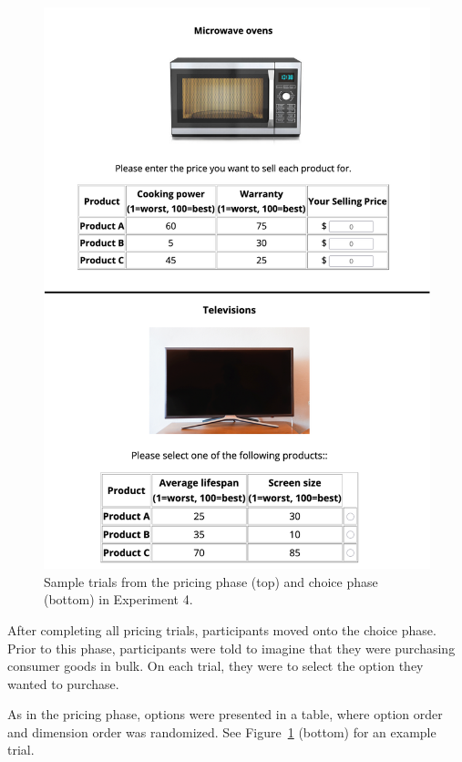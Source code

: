 \begin{figure}
    \includegraphics{figures/ce_rating_choice_example_trial.jpg}
    \caption{Sample trials from the pricing phase (top) and choice phase (bottom) in Experiment 4.}
    \label{fig:ce_rating_choice_trial}
\end{figure}

After completing all pricing trials, participants moved onto the choice phase. Prior to this phase, participants were told to imagine that they were purchasing consumer goods in bulk. On each trial, they were to select the option they wanted to purchase. 

As in the pricing phase, options were presented in a table, where option order and dimension order was randomized. See Figure~\ref{fig:ce_rating_choice_trial} (bottom) for an example trial.

